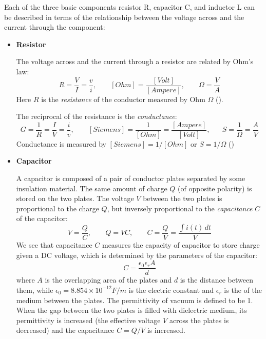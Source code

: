 \begin{itemize}
Each of the three basic components resistor R, capacitor C, and inductor
L can be described in terms of the relationship between the voltage 
across and the current through the component:

\begin{itemize}
\item {\bf Resistor}

  The voltage across and the current through a resistor are related 
  by Ohm's law:
  \[
  R=\frac{V}{I}=\frac{v}{i},\;\;\;\;\;\;\;[Ohm]=\frac{[Volt]}{[Ampere]},
  \;\;\;\;\;\;\;
  \Omega=\frac{V}{A}
  \]
  Here $R$ is the {\em resistance} of the conductor measured by Ohm 
  $\Omega$
  (). 

  The reciprocal of the resistance is the {\em conductance}:
  \[ 
  G=\frac{1}{R}=\frac{I}{V}=\frac{i}{v},\;\;\;\;\;\;\;
  [Siemens]=\frac{1}{[Ohm]}=\frac{[Ampere]}{[Volt]},
  \;\;\;\;\;\;S=\frac{1}{\Omega}=\frac{A}{V}
  \]
  Conductance is measured by $[Siemens]=1/[Ohm]$ or $S=1/\Omega$
  ()



\item {\bf Capacitor}

  A capacitor is composed of a pair of conductor plates separated by some 
  insulation material. The same amount of charge $Q$ (of opposite polarity) 
  is stored on the two plates. The voltage $V$ between the two plates is 
  proportional to the charge $Q$, but inversely proportional to the 
  {\em capacitance} $C$ of the capacitor:
  \[
  V=\frac{Q}{C},\;\;\;\;\;\;\;Q=VC,\;\;\;\;\;\;\;
  C=\frac{Q}{V}=\frac{\int i(t)\,dt}{V}
  \]
  We see that capacitance $C$ measures the capacity of capacitor to store 
  charge given a DC voltage, which is determined by the parameters of the
  capacitor:
  \[
  C=\frac{\epsilon_0\epsilon_r A}{d}
  \]
  where $A$ is the overlapping area of the plates and $d$ is the distance 
  between them, while $\epsilon_0=8.854\times 10^{-12} F/m$ is the electric
  constant and $\epsilon_r$ is the 
  of the medium between the plates. The permittivity of vacuum is defined to be 1. 
  When the gap between the two plates is filled with dielectric medium, its 
  permittivity is increased (the effective voltage $V$ across the plates
  is decreased) and the capacitance $C=Q/V$ is increased. 


\end{itemize}
\end{itemize}
